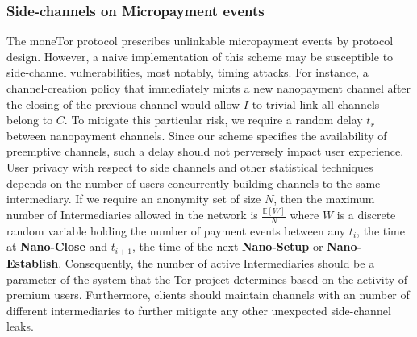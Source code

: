 \subsubsection{Side-channels on Micropayment events}

The moneTor protocol prescribes unlinkable micropayment events by protocol
design. However, a naive implementation of this scheme may be susceptible to
side-channel vulnerabilities, most notably, timing attacks. For instance, a
channel-creation policy that immediately mints a new nanopayment channel after
the closing of the previous channel would allow $I$ to trivial link all channels
belong to $C$. To mitigate this particular risk, we require a random delay $t_r$
between nanopayment channels. Since our scheme specifies the availability of
preemptive channels, such a delay should not perversely impact user experience.
User privacy with respect to side channels and other statistical techniques
depends on the number of users concurrently building channels to the same
intermediary. If we require an anonymity set of size $N$, then the maximum
number of Intermediaries allowed in the network is $\frac{\mathbb{E}[W]}{N}$
where $W$ is a discrete random variable holding the number of payment events
between any $t_i$, the time at \textbf{Nano-Close} and $t_{i+1}$, the time of
the next \textbf{Nano-Setup} or \textbf{Nano-Establish}. Consequently, the
number of active Intermediaries should be a parameter of the system that the Tor
project determines based on the activity of premium users. Furthermore, clients
should maintain channels with an number of different intermediaries to further
mitigate any other unexpected side-channel leaks.



